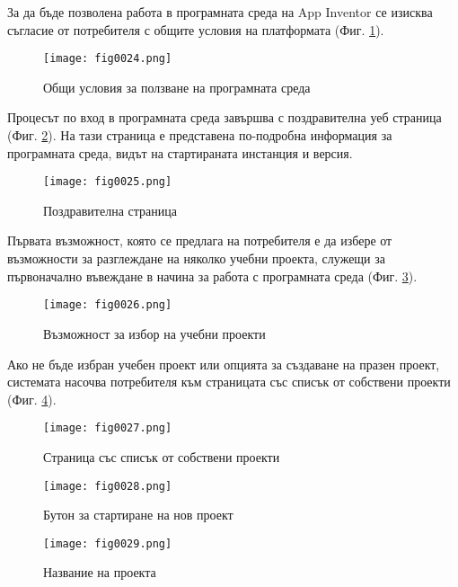 За да бъде позволена работа в програмната среда на App Inventor се изисква съгласие от потребителя с общите условия на платформата (Фиг. \ref{fig0024}).

\begin{figure}[H]
  \centering
  \texttt{[image: fig0024.png]}
  \caption{Общи условия за ползване на програмната среда}
\label{fig0024}
\end{figure}

Процесът по вход в програмната среда завършва с поздравителна уеб страница (Фиг. \ref{fig0025}). На тази страница е представена по-подробна информация за програмната среда, видът на стартираната инстанция и версия. 

\begin{figure}[H]
  \centering
  \texttt{[image: fig0025.png]}
  \caption{Поздравителна страница}
\label{fig0025}
\end{figure}

Първата възможност, която се предлага на потребителя е да избере от възможности за разглеждане на няколко учебни проекта, служещи за първоначално въвеждане в начина за работа с програмната среда (Фиг. \ref{fig0026}).

\begin{figure}[H]
  \centering
  \texttt{[image: fig0026.png]}
  \caption{Възможност за избор на учебни проекти}
\label{fig0026}
\end{figure}

Ако не бъде избран учебен проект или опцията за създаване на празен проект, системата насочва потребителя към страницата със списък от собствени проекти (Фиг. \ref{fig0027}).

\begin{figure}[H]
  \centering
  \texttt{[image: fig0027.png]}
  \caption{Страница със списък от собствени проекти}
\label{fig0027}
\end{figure}

\begin{figure}[H]
  \centering
  \texttt{[image: fig0028.png]}
  \caption{Бутон за стартиране на нов проект}
\label{fig0028}
\end{figure}

\begin{figure}[H]
  \centering
  \texttt{[image: fig0029.png]}
  \caption{Название на проекта}
\label{fig0029}
\end{figure}

